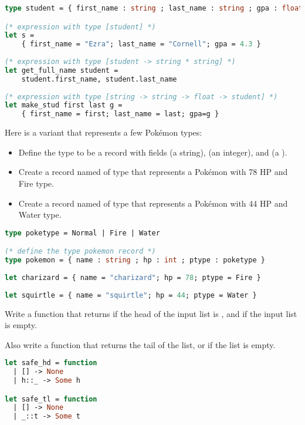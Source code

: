 \begin{lstlisting}[language=OCaml]
type student = { first_name : string ; last_name : string ; gpa : float }

(* expression with type [student] *)
let s =
	{ first_name = "Ezra"; last_name = "Cornell"; gpa = 4.3 }
	
(* expression with type [student -> string * string] *)
let get_full_name student =
	student.first_name, student.last_name
	
(* expression with type [string -> string -> float -> student] *)
let make_stud first last g =
	{ first_name = first; last_name = last; gpa=g }
\end{lstlisting}


\problem[pokerecord]
Here is a variant that represents a few Pokémon types:
\begin{itemize}
  \item Define the type  to be a record with fields  (a string),  (an integer), and  (a ).
  \item Create a record named  of type  that represents a Pokémon with 78 HP and Fire type.
  \item Create a record named  of type  that represents a Pokémon with 44 HP and Water type.
\end{itemize}

\begin{lstlisting}[language=OCaml]
type poketype = Normal | Fire | Water

(* define the type pokemon record *)
type pokemon = { name : string ; hp : int ; ptype : poketype }
	
let charizard = { name = "charizard"; hp = 78; ptype = Fire }
	
let squirtle = { name = "squirtle"; hp = 44; ptype = Water }
\end{lstlisting}

Write a function  that returns  if the head of the input list is , and  if the input list is empty.

Also write a function  that returns the tail of the list, or  if the list is empty.

\begin{lstlisting}[language=OCaml]
let safe_hd = function
  | [] -> None
  | h::_ -> Some h

let safe_tl = function
  | [] -> None
  | _::t -> Some t
\end{lstlisting}

